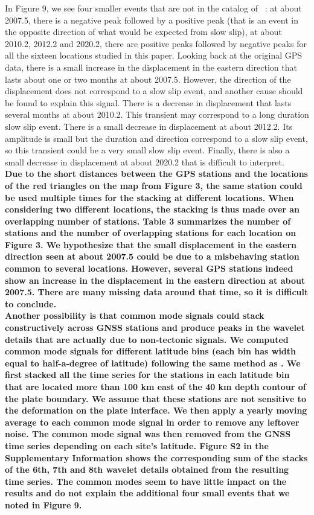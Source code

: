 \documentclass{article}
\begin{document}
In Figure 9, we see four smaller events that are not in the catalog of ~\citet{MIC_2019}: at about 2007.5, there is a negative peak followed by a positive peak (that is an event in the opposite direction of what would be expected from slow slip), at about 2010.2, 2012.2 and 2020.2, there are positive peaks followed by negative peaks for all the sixteen locations studied in this paper. Looking back at the original GPS data, there is a small increase in the displacement in the eastern direction that lasts about one or two months at about 2007.5. However, the direction of the displacement does not correspond to a slow slip event, and another cause should be found to explain this signal. There is a decrease in displacement that lasts several months at about 2010.2. This transient may correspond to a long duration slow slip event. There is a small decrease in displacement at about 2012.2. Its amplitude is small but the duration and direction correspond to a slow slip event, so this transient could be a very small slow slip event. Finally, there is also a small decrease in displacement at about 2020.2 that is difficult to interpret. \\

\textbf{Due to the short distances between the GPS stations and the locations of the red triangles on the map from Figure 3, the same station could be used multiple times for the stacking at different locations. When considering two different locations, the stacking is thus made over an overlapping number of stations. Table 3 summarizes the number of stations and the number of overlapping stations for each location on Figure 3. We hypothesize that the small displacement in the eastern direction seen at about 2007.5 could be due to a misbehaving station common to several locations. However, several GPS stations indeed show an increase in the displacement in the eastern direction at about 2007.5. There are many missing data around that time, so it is difficult to conclude.} \\

\textbf{Another possibility is that common mode signals could stack constructively across GNSS stations and produce peaks in the wavelet details that are actually due to non-tectonic signals. We computed common mode signals for different latitude bins (each bin has width equal to half-a-degree of latitude) following the same method as \citet{NUY_2021}. We first stacked all the time series for the stations in each latitude bin that are located more than 100 km east of the 40 km depth contour of the plate boundary. We assume that these stations are not sensitive to the deformation on the plate interface. We then apply a yearly moving average to each common mode signal in order to remove any leftover noise. The common mode signal was then removed from the GNSS time series depending on each site’s latitude. Figure S2 in the Supplementary Information shows the corresponding sum of the stacks of the 6th, 7th and 8th wavelet details obtained from the resulting time series. The common modes seem to have little impact on the results and do not explain the additional four small events that we noted in Figure 9.}
\end{document}
